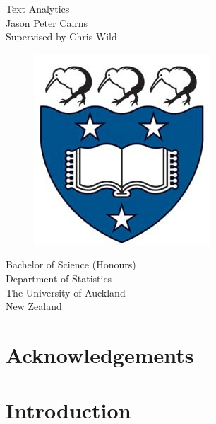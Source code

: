 \documentclass[11pt, a4paper, oneside]{report}
\begin{document}
\begin{titlepage}
  \centering
  \vspace*{2.5cm}
  {\Huge Text Analytics}\\
  \vspace{1.5cm}
  {\Large Jason Peter Cairns}\\
  \vspace{1.5cm}
  Supervised by Chris Wild\\
  \vspace{1.5cm}
  \begin{figure}[h]
    \centering
    \includegraphics[scale=0.4]{img/logo.jpg}
  \end{figure}
  \vspace{1cm}
  Bachelor of Science (Honours)\\
  Department of Statistics\\
  The University of Auckland\\
  New Zealand
\end{titlepage}

\listoftodos



\chapter*{Acknowledgements}
\label{cha:acknowledgements}

\tableofcontents
{}
\renewcommand\listoflistingscaption{List of source codes}
\listoflistings
{}
\listoftables
{}
\listoffigures

\chapter{Introduction}
\label{cha:introduction}
\end{document}
